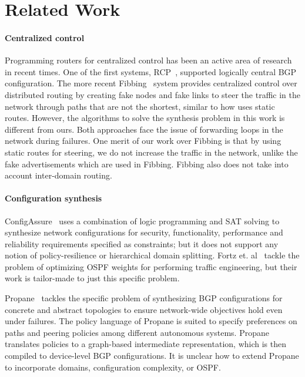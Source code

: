 \section{Related Work}\label{sec:related}
\paragraph{Centralized control} Programming routers for centralized
control has been an active area of research in recent times. One of
the first systems, RCP~\cite{rcp}, supported logically central BGP
configuration. The more recent Fibbing~\cite{fibbing} system provides
centralized control over distributed routing by creating fake nodes
and fake links to steer the traffic in the network through paths that
are not the shortest, similar to how \name uses static routes. 
However, the algorithms to solve the synthesis problem 
in this work is different from ours.  
Both approaches face the issue of  
forwarding loops in the network during failures. 
One merit of our work over Fibbing is that by using 
static routes for steering, we do not increase the 
traffic in the network, unlike the fake advertisements 
which are used in Fibbing. Fibbing also does not take into
account inter-domain routing.



\paragraph{Configuration synthesis} 
ConfigAssure~\cite{configassure}
uses a combination of logic programming and SAT solving to synthesize
network configurations for security, 
functionality, performance and
reliability requirements specified as constraints; 
but it does not
support any notion of policy-resilience 
or hierarchical domain splitting.  Fortz
et. al~\cite{ospf-te} tackle the problem of optimizing OSPF weights
for performing traffic engineering, but their work is tailor-made
to just this specific problem.

Propane~\cite{propane, propaneat} tackles the specific problem of synthesizing
BGP configurations for concrete and abstract topologies 
to ensure network-wide objectives hold even under
failures. The policy language of Propane is suited to specify
preferences on paths and peering policies among different autonomous
systems. Propane translates policies
to a graph-based intermediate representation, which is then compiled
to device-level BGP configurations. It is unclear how to extend
Propane to incorporate domains, configuration complexity, or OSPF.

